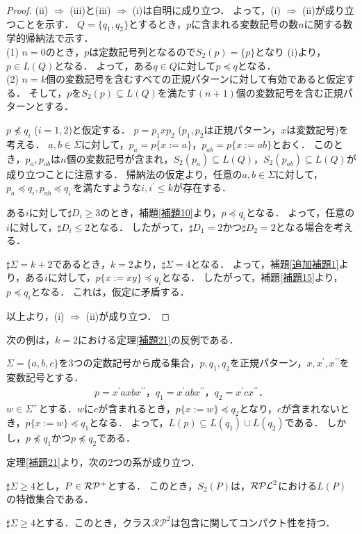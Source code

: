 \begin{proof}
(ii) $\Rightarrow$ (iii)と(iii) $\Rightarrow$ (i)は自明に成り立つ．
よって，(i) $\Rightarrow$ (ii)が成り立つことを示す．
$Q= \{ q_{1}, q_{2} \}$とするとき，$p$に含まれる変数記号の数$n$に関する数学的帰納法で示す．\\
\noindent (1) $n=0$のとき，$p$は定数記号列となるので$S_{2}(p)= \{ p \}$となり
(i)より，$p \in L(Q)$となる．
よって，ある$q \in Q$に対して$p \preceq q$となる．\\
\noindent (2) $n=k$個の変数記号を含むすべての正規パターンに対して有効であると仮定する．
そして，$p$を$S_{2}(p) \subseteq L(Q)$を満たす$(n+1)$個の変数記号を含む正規パターンとする．

$p \not \preceq q_{i}$ ($i=1, 2$)と仮定する．
$p=p_{1}xp_{2}$ ($p_{1}, p_{2}$は正規パターン，$x$は変数記号)を考える．
$a, b \in \Sigma$に対して，$p_{a}=p \{ x := a \}$，$p_{ab}=p \{ x := ab \}$とおく．
このとき，$p_{a},p_{ab}$は$n$個の変数記号が含まれ，$S_{2}(p_{a}) \subseteq L(Q)$，$S_{2}(p_{ab}) \subseteq L(Q)$が成り立つことに注意する．
帰納法の仮定より，任意の$a, b \in \Sigma$に対して，$p_{a} \preceq q_{i}, p_{ab} \preceq q_{i^{\prime}}$を満たすような$i, i^{\prime} \le k$が存在する．

ある$i$に対して$\sharp D_{i} \ge 3$のとき，補題\ref{補題10}より，$p \preceq q_{i}$となる．
よって，任意の$i$に対して，$\sharp D_{i} \le 2$となる．
したがって，$\sharp D_{1}=2$かつ$\sharp D_{2}=2$となる場合を考える．

$\sharp \Sigma = k+2$であるとき，$k=2$より，$\sharp \Sigma =4$となる．
よって，補題\ref{追加補題1}より，ある$i$に対して，$p \{ x:=xy \} \preceq q_{i}$となる．
したがって，補題\ref{補題15}より，$p \preceq q_{i}$となる．
これは，仮定に矛盾する．

以上より，(i) $\Rightarrow$ (ii)が成り立つ．
\end{proof}

次の例は，$k = 2$における定理\ref{補題21}の反例である．
\begin{ex}\label{反例thm17}
$\Sigma= \{a, b, c \}$を$3$つの定数記号から成る集合，$p,q_{1},q_{2}$を正規パターン，$x,x^{\prime},x^{\prime\prime}$を変数記号とする．
\begin{eqnarray*}
p = x^{\prime}axbx^{\prime\prime}，
q_{1} = x^{\prime}abx^{\prime\prime}，
q_{2} = x^{\prime}cx^{\prime\prime}．
\end{eqnarray*}
$w \in \Sigma^{+}$とする．$w$に$c$が含まれるとき，$p \{ x:=w \} \preceq q_{2}$となり，$c$が含まれないとき，$p \{ x:=w \} \preceq q_{1}$となる．
よって，$L(p) \subseteq L(q_{1}) \cup L(q_{2})$である．
しかし，$p \not \preceq q_{1}$かつ$p \not \preceq q_{2}$である．
\end{ex}

定理\ref{補題21}より，次の2つの系が成り立つ．
\begin{col}
$\sharp\Sigma \ge 4$とし，$P \in \mathcal{RP^{+}}$とする．
このとき，$S_{2}(P)$は，$\mathcal{RPL}^{2}$における$L(P)$の特徴集合である．
\end{col}

\begin{col}
$\sharp\Sigma \ge 4$とする．このとき，クラス$\mathcal{RP}^{2}$は包含に関してコンパクト性を持つ．
\end{col}

